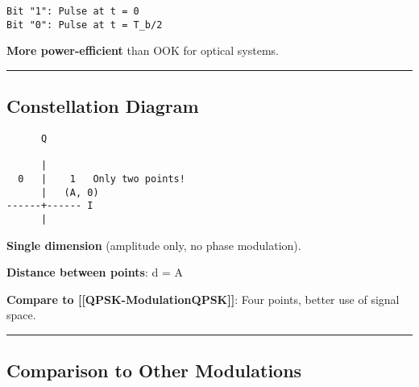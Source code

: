 \begin{verbatim}
Bit "1": Pulse at t = 0
Bit "0": Pulse at t = T_b/2
\end{verbatim}

\textbf{More power-efficient} than OOK for optical systems.

\begin{center}\rule{0.5\linewidth}{0.5pt}\end{center}

\subsection{\texorpdfstring{ Constellation
Diagram}{ Constellation Diagram}}\label{constellation-diagram}

\begin{verbatim}
      Q
      
      |
  0   |    1   Only two points!
      |   (A, 0)
------+------ I
      |
\end{verbatim}

\textbf{Single dimension} (amplitude only, no phase modulation).

\textbf{Distance between points}: d = A

\textbf{Compare to {[}{[}QPSK-Modulation\textbar QPSK{]}{]}}: Four
points, better use of signal space.

\begin{center}\rule{0.5\linewidth}{0.5pt}\end{center}

\subsection{\texorpdfstring{ Comparison to Other
Modulations}{ Comparison to Other Modulations}}\label{comparison-to-other-modulations}

